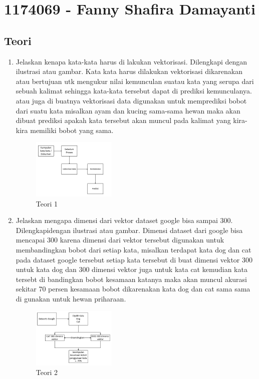 \section{1174069 - Fanny Shafira Damayanti}
\subsection{Teori}
\begin{enumerate}
	\item Jelaskan kenapa kata-kata harus di lakukan vektorisasi. Dilengkapi dengan ilustrasi atau gambar.
	\hfill\break
	Kata kata harus dilakukan vektorisasi dikarenakan atau bertujuan utk mengukur nilai kemunculan suatau kata yang serupa dari sebuah kalimat sehingga kata-kata tersebut dapat di prediksi kemunculanya. atau juga di buatnya vektorisasi data digunakan untuk memprediksi bobot dari suatu kata misalkan ayam dan kucing sama-sama hewan maka akan dibuat prediksi apakah kata tersebut akan muncul pada kalimat yang kira-kira memiliki bobot yang sama.
	\hfill\break
	\begin{figure}[H]
		\includegraphics[width=4cm]{figures/1174069/5/1.png}
		\centering
		\caption{Teori 1}
	\end{figure}

	\item Jelaskan mengapa dimensi dari vektor dataset google bisa sampai 300. Dilengkapidengan ilustrasi atau gambar.
	\hfill\break
	Dimensi dataset dari google bisa mencapai 300 karena dimensi dari vektor tersebut digunakan untuk membandingkan bobot dari setiap kata, misalkan terdapat kata dog dan cat pada dataset google tersebut setiap kata tersebut di buat dimensi vektor 300 untuk kata dog dan 300 dimensi vektor juga untuk kata cat kemudian kata tersebt di bandingkan bobot kesamaan katanya maka akan muncul akurasi sekitar 70 persen kesamaan bobot dikarenakan kata dog dan cat sama sama di gunakan untuk hewan priharaan.
	\hfill\break
	\begin{figure}[H]
		\includegraphics[width=4cm]{figures/1174069/5/2.png}
		\centering
		\caption{Teori 2}
	\end{figure}


\end{enumerate}
